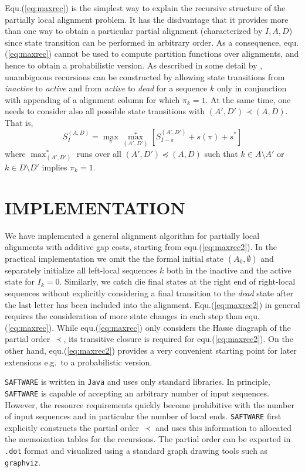 \documentclass[a4paper,10pt]{article}
\newcommand{\TODO}[1]{\begingroup\color{red}#1\endgroup}
\newcommand{\SAFTWARE}{\TODO{\texttt{SAFTWARE}}}
\begin{document}
Equ.(\ref{eq:maxrec}) is the simplest way to explain the recursive
structure of the partially local alignment problem. It has the disdvantage
that it provides more than one way to obtain a particular partial alignment
(characterized by $I,A,D$) since state transition can be performed in
arbitrary order. As a consequence, equ.(\ref{eq:maxrec}) cannot be used to
compute partition functions over alignments, and hence to obtain a
probabilistic version. As described in some detail by \citet{Retzlaff:18a},
unambiguous recursions can be constructed by allowing state transitions
from \textit{inactive} to \textit{active} and from \textit{active} to
\textit{dead} for a sequence $k$ only in conjunction with appending of a
alignment column for which $\pi_k=1$.  At the same time, one needs to
consider also all possible state transitions with $(A',D')\prec(A,D)$. That
is,
\begin{equation}
  S^{(A,D)}_I = 
  \displaystyle\max_{\pi} \displaystyle\max_{(A',D')}^*
  \left[ S^{(A',D')}_{I-\pi} + s(\pi) + s^* \right]
  \label{eq:maxrec2}
\end{equation}
where $\max_{(A',D')}^*$ runs over all $(A',D')\preceq(A,D)$ such that
$k\in A\setminus A'$ or $k\in D\setminus D'$ implies $\pi_k=1$.

\section{\uppercase{Implementation}}

We have implemented a general alignment algorithm for partially local
alignments with additive gap costs, starting from
equ.(\ref{eq:maxrec2}). In the practical implementation we omit the the
formal initial state $(A_0,\emptyset)$ and separately initialize all
left-local sequences $k$ both in the inactive and the active state for
$I_k=0$. Similarly, we catch die final states at the right end of
right-local sequences without explicitly considering a final transition to
the \textit{dead} state after the last letter has been included into the
alignment. Equ.(\ref{eq:maxrec2}) in general requires the consideration of
more state changes in each step than equ.(\ref{eq:maxrec}). While
equ.(\ref{eq:maxrec}) only considers the Hasse diagraph of the partial
order $\prec$, its transitive closure is required for
equ.(\ref{eq:maxrec2}). On the other hand, equ.(\ref{eq:maxrec2}) provides
a very convenient starting point for later extensions e.g.\ to a
probabilistic version. 

\SAFTWARE{} is written in \texttt{Java} and uses only standard libraries.
In principle, \SAFTWARE{} is capable of accepting an arbitrary number of
input sequences. However, the resource requirements quickly become
prohibitive with the number of input sequences and in particular the number
of local ends. \SAFTWARE{} first explicitly constructs the partial order
$\prec$ and uses this information to allocated the memoization tables for
the recursions. The partial order can be exported in \texttt{.dot} format
and visualized using a standard graph drawing tools such as
\texttt{graphviz}.
\end{document}
